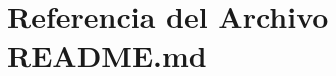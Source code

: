 \hypertarget{README_8md}{}\section{Referencia del Archivo R\+E\+A\+D\+M\+E.\+md}
\label{README_8md}
